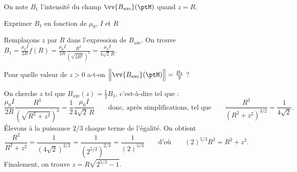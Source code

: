 

\pauseEntrainement


\bigskip

On note $B_1$ l'intensité du champ  $\vv{B_{\text{axe}}}(\ptM)$ quand $z=R$.


\repriseEntrainement





\begin{enonce}
Exprimer $B_1$ en fonction de $\mu_0$, $I$ et $R$
\end{enonce}


\begin{corrige}
Remplaçons $z$ par $R$ dans l'expression de $B_\text{axe}$. On trouve $B_1=\frac{\mu_0I}{2R}f(R)=
\frac{\mu_0I}{2R}\frac{R^3}{\left(\sqrt{2R^2}\right)^3}=
\frac{\mu_0I}{4\sqrt{2}\,R}$.
\end{corrige}





\begin{enonce}
Pour quelle valeur de $z>0$ a-t-on $\Big\|\vv{B_{\text{axe}}}(\ptM)\Big\| = \frac{B_1}{2}$ ?
\end{enonce}


\begin{corrige}
On cherche $z$ tel que $B_\text{axe}(z)=\frac12 B_1$, c'est-à-dire tel que :
\[
\frac{\mu_0I}{2R}\frac{R^3}{\left(\sqrt{R^2+z^2}\right)^3}=
\frac12\frac{\mu_0I}{4\sqrt{2}\,R}
\qquad\text{donc, après simplifications, tel que}\qquad
\frac{R^3}{\left(R^2+z^2\right)^{3/2}}=
\frac{1}{4\sqrt{2}}.
\]
Élevons à la puissance $2/3$ chaque terme de l'égalité. On obtient
\[
\frac{R^2}{R^2+z^2}=
\frac{1}{\left(4\sqrt{2}\right)^{2/3}}=
\frac{1}{\left(2^{5/2}\right)^{2/3}}=
\frac{1}{\left(2\right)^{5/3}}
\qquad\text{d'où}\qquad
\left(2\right)^{5/3}R^2=R^2+z^2.
\]
Finalement, on trouve $z=R\sqrt{2^{5/3}-1}$.
\end{corrige}

